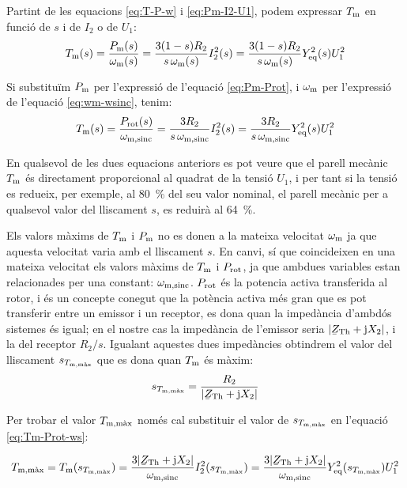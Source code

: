 Partint de les equacions \eqref{eq:T-P-w} i \eqref{eq:Pm-I2-U1}, podem expressar  $T_\mathrm{m}$ en funció de $s$ i de $I_2$ o de $U_1$:
\begin{equation}
    T_\mathrm{m}(s)  =  \frac{P_\mathrm{m}(s)}{\omega_\mathrm{m}(s)} =  \frac{3(1-s) R_2}{s\,\omega_\mathrm{m}(s)} I_2^2(s) =
     \frac{3(1-s) R_2}{s\,\omega_\mathrm{m}(s)} Y_\mathrm{eq}^2(s) U_1^2
\end{equation}

Si substituïm $P_\mathrm{m}$ per l'expressió de l'equació \eqref{eq:Pm-Prot}, i $\omega_\mathrm{m}$ per l'expressió de l'equació \eqref{eq:wm-wsinc}, tenim:
\begin{equation}\index{motors d'inducció!parell mecànic}
    T\ped{m}(s)  =  \frac{P\ped{rot}(s)}{\omega\ped{m,sinc}} =   \frac{3 R_2}{s\,\omega\ped{m,sinc}} I_2^2(s) =
     \frac{3 R_2}{s\,\omega\ped{m,sinc}} Y\ped{eq}^2(s) U_1^2 \label{eq:Tm-Prot-ws}
\end{equation}

En qualsevol de les dues equacions anteriors es pot veure que el parell mecànic $T_\mathrm{m}$ és directament proporcional al quadrat de la tensió $U_1$, i per tant si la tensió es redueix, per exemple, al \SI{80}{\%} del seu valor nominal, el parell mecànic per a qualsevol valor del lliscament $s$,  es reduirà al \SI{64}{\%}.

Els valors màxims de $T_\mathrm{m}$ i $P_\mathrm{m}$ no es donen a la mateixa velocitat  $\omega_\mathrm{m}$ ja que aquesta velocitat varia amb el lliscament $s$. En canvi, sí que coincideixen en una mateixa velocitat els valors  màxims de $T_\mathrm{m}$ i $P_\mathrm{rot}$, ja que ambdues variables estan relacionades per una constant: $\omega_\mathrm{m,sinc}$. $P_\mathrm{rot}$ és la potencia activa transferida al rotor, i és un concepte conegut que la potència activa més gran que es pot transferir entre un emissor i un receptor, es dona quan la impedància d'ambdós sistemes és igual; en el nostre cas la impedància de l'emissor seria $|\cmplx{Z}\ped{Th} + \ju X_2|$, i la del receptor $R_2/s$. Igualant aquestes dues impedàncies obtindrem el valor del lliscament $s_{T_\mathrm{m,\text{màx}}}$ que es dona quan $T_\mathrm{m}$ és màxim:
\begin{equation}
    s_{T\ped{m,\text{màx}}} =  \frac{R_2}{|\cmplx{Z}\ped{Th} + \ju X_2|} \label{eq:s-T-max}
\end{equation}

Per trobar el valor  $T_\mathrm{m,\text{màx}}$ només cal substituir el valor de $s_{T_\mathrm{m,\text{màx}}}$ en l'equació \eqref{eq:Tm-Prot-ws}:

\begin{equation}
    T\ped{m,\text{màx}}  =  T\ped{m}(s_{T\ped{m,\text{màx}}}) =  \frac{3 |\cmplx{Z}\ped{Th} + \ju X_2|}{\omega\ped{m,sinc}} I_2^2(s_{T\ped{m,\text{màx}}}) = \frac{3 |\cmplx{Z}\ped{Th} + \ju X_2|}{\omega\ped{m,sinc}} Y\ped{eq}^2(s_{T\ped{m,\text{màx}}}) U_1^2
\end{equation}


